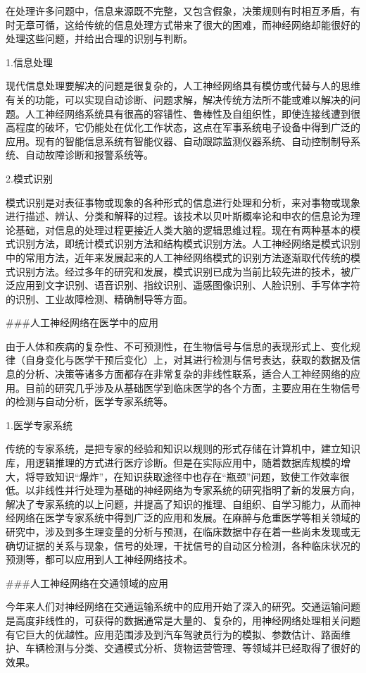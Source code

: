 在处理许多问题中，信息来源既不完整，又包含假象，决策规则有时相互矛盾，有时无章可循，这给传统的信息处理方式带来了很大的困难，而神经网络却能很好的处理这些问题，并给出合理的识别与判断。

1.信息处理

现代信息处理要解决的问题是很复杂的，人工神经网络具有模仿或代替与人的思维有关的功能，可以实现自动诊断、问题求解，解决传统方法所不能或难以解决的问题。人工神经网络系统具有很高的容错性、鲁棒性及自组织性，即使连接线遭到很高程度的破坏，它仍能处在优化工作状态，这点在军事系统电子设备中得到广泛的应用。现有的智能信息系统有智能仪器、自动跟踪监测仪器系统、自动控制制导系统、自动故障诊断和报警系统等。

2.模式识别

模式识别是对表征事物或现象的各种形式的信息进行处理和分析，来对事物或现象进行描述、辨认、分类和解释的过程。该技术以贝叶斯概率论和申农的信息论为理论基础，对信息的处理过程更接近人类大脑的逻辑思维过程。现在有两种基本的模式识别方法，即统计模式识别方法和结构模式识别方法。人工神经网络是模式识别中的常用方法，近年来发展起来的人工神经网络模式的识别方法逐渐取代传统的模式识别方法。经过多年的研究和发展，模式识别已成为当前比较先进的技术，被广泛应用到文字识别、语音识别、指纹识别、遥感图像识别、人脸识别、手写体字符的识别、工业故障检测、精确制导等方面。

###人工神经网络在医学中的应用

由于人体和疾病的复杂性、不可预测性，在生物信号与信息的表现形式上、变化规律（自身变化与医学干预后变化）上，对其进行检测与信号表达，获取的数据及信息的分析、决策等诸多方面都存在非常复杂的非线性联系，适合人工神经网络的应用。目前的研究几乎涉及从基础医学到临床医学的各个方面，主要应用在生物信号的检测与自动分析，医学专家系统等。

1.医学专家系统

传统的专家系统，是把专家的经验和知识以规则的形式存储在计算机中，建立知识库，用逻辑推理的方式进行医疗诊断。但是在实际应用中，随着数据库规模的增大，将导致知识“爆炸”，在知识获取途径中也存在“瓶颈”问题，致使工作效率很低。以非线性并行处理为基础的神经网络为专家系统的研究指明了新的发展方向，解决了专家系统的以上问题，并提高了知识的推理、自组织、自学习能力，从而神经网络在医学专家系统中得到广泛的应用和发展。在麻醉与危重医学等相关领域的研究中，涉及到多生理变量的分析与预测，在临床数据中存在着一些尚未发现或无确切证据的关系与现象，信号的处理，干扰信号的自动区分检测，各种临床状况的预测等，都可以应用到人工神经网络技术。

###人工神经网络在交通领域的应用

今年来人们对神经网络在交通运输系统中的应用开始了深入的研究。交通运输问题是高度非线性的，可获得的数据通常是大量的、复杂的，用神经网络处理相关问题有它巨大的优越性。应用范围涉及到汽车驾驶员行为的模拟、参数估计、路面维护、车辆检测与分类、交通模式分析、货物运营管理、等领域并已经取得了很好的效果。

